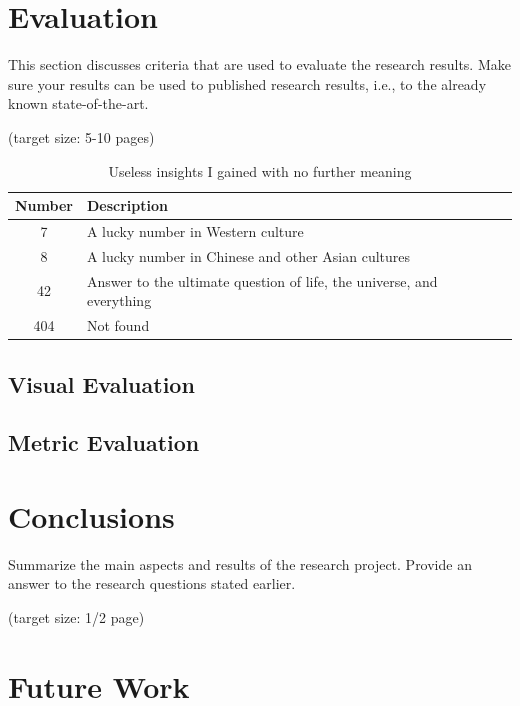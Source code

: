 \documentclass[a4paper,11pt,oneside]{article}
\begin{document}
  \section{Evaluation}

  This section discusses criteria that are used to evaluate the
  research results. Make sure your results can be used to published
  research results, i.e., to the already known state-of-the-art.

  (target size: 5-10 pages)

  \begin{table}[ht]
    \begin{center}
      \begin{tabular}{cl}
        \toprule
        Number & Description \\
        \midrule
        7 & A lucky number in Western culture \\
        8 & A lucky number in Chinese and other Asian cultures \\
        42 & Answer to the ultimate question of life, the universe, and everything \\
        404 & Not found \\
        \bottomrule
      \end{tabular}
      \caption{Useless insights I gained with no further meaning}
    \end{center}
  \end{table}

  \subsection{Visual Evaluation}
  \subsection{Metric Evaluation}

  \section{Conclusions}

  Summarize the main aspects and results of the research
  project. Provide an answer to the research questions stated earlier.

  (target size: 1/2 page)

  \section{Future Work}

  \newpage

  \printbibliography
\end{document}

